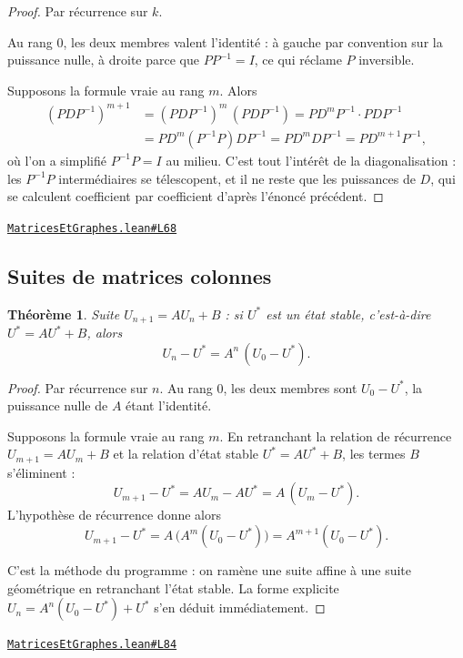 \documentclass[11pt,a4paper]{article}
\theoremstyle{definition}
\theoremstyle{plain}
\newtheorem{theoreme}{Théorème}
\newcommand{\source}[2]{\par\smallskip\noindent\hfill{\footnotesize\href{#1}{\texttt{#2}}}\par\smallskip}
\begin{document}
\begin{proof}
Par récurrence sur $k$.

Au rang $0$, les deux membres valent l'identité : à gauche par convention sur la puissance
nulle, à droite parce que $PP^{-1} = I$, ce qui réclame $P$ inversible.

Supposons la formule vraie au rang $m$. Alors
\begin{align*}
  (PDP^{-1})^{m+1} &= (PDP^{-1})^{m}\,(PDP^{-1}) = P D^{m} P^{-1} \cdot P D P^{-1} \\
   &= P D^{m} (P^{-1}P) D P^{-1} = P D^{m} D P^{-1} = P D^{m+1} P^{-1} ,
\end{align*}
où l'on a simplifié $P^{-1}P = I$ au milieu. C'est tout l'intérêt de la diagonalisation :
les $P^{-1}P$ intermédiaires se télescopent, et il ne reste que les puissances de $D$, qui
se calculent coefficient par coefficient d'après l'énoncé précédent.
\end{proof}
\source{https://github.com/Commutator-IO/learn-lean/blob/main/cours/02-lycee/10-specialite-mathematiques-terminale-s/MatricesEtGraphes.lean\#L68}{MatricesEtGraphes.lean\#L68}

\subsection{Suites de matrices colonnes}

\begin{theoreme}
Suite $U_{n+1} = AU_n + B$ : si $U^{*}$ est un état stable, c'est-à-dire
$U^{*} = AU^{*} + B$, alors
\[ U_n - U^{*} = A^{n}\,(U_0 - U^{*}) . \]
\end{theoreme}

\begin{proof}
Par récurrence sur $n$. Au rang $0$, les deux membres sont $U_0 - U^{*}$, la puissance
nulle de $A$ étant l'identité.

Supposons la formule vraie au rang $m$. En retranchant la relation de récurrence
$U_{m+1} = AU_m + B$ et la relation d'état stable $U^{*} = AU^{*} + B$, les termes $B$
s'éliminent :
\[ U_{m+1} - U^{*} = A U_m - A U^{*} = A\,(U_m - U^{*}) . \]
L'hypothèse de récurrence donne alors
\[ U_{m+1} - U^{*} = A\,\bigl(A^{m}(U_0 - U^{*})\bigr) = A^{m+1}(U_0 - U^{*}) . \]

\medskip\noindent
C'est la méthode du programme : on ramène une suite affine à une suite géométrique en
retranchant l'état stable. La forme explicite $U_n = A^{n}(U_0 - U^{*}) + U^{*}$ s'en
déduit immédiatement.
\end{proof}
\source{https://github.com/Commutator-IO/learn-lean/blob/main/cours/02-lycee/10-specialite-mathematiques-terminale-s/MatricesEtGraphes.lean\#L84}{MatricesEtGraphes.lean\#L84}
\end{document}
